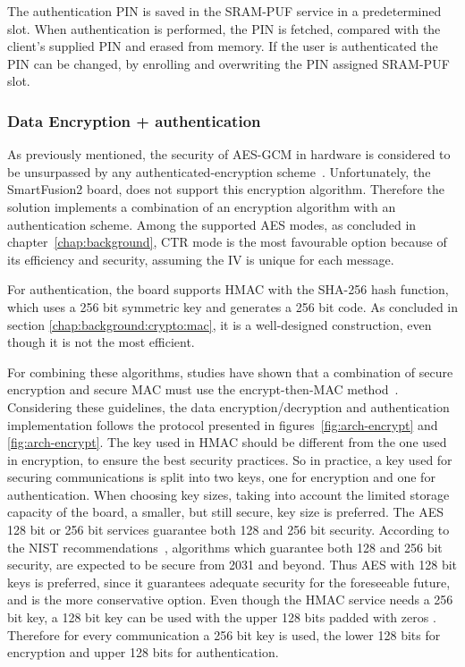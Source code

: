 The authentication PIN is saved in the SRAM-PUF service in a predetermined slot. When authentication is performed, the PIN is fetched, compared with the client's supplied PIN and erased from memory.
If the user is authenticated the PIN can be changed, by enrolling and overwriting the PIN assigned SRAM-PUF slot.

\subsubsection*{Data Encryption + authentication}

As previously mentioned, the security of \ac{AES}-\ac{GCM} in hardware is considered to be unsurpassed by any authenticated-encryption scheme~\cite{aesmodes}.
Unfortunately, the SmartFusion2 board, does not support this encryption algorithm.
Therefore the solution implements a combination of an encryption algorithm with an authentication scheme. Among the supported \ac{AES} modes, as concluded in chapter~\ref{chap:background}, CTR mode is the most favourable option because of its efficiency and security, assuming the IV is unique for each message.

For authentication, the board supports \ac{HMAC} with the \ac{SHA}-256 hash function, which uses a 256 bit symmetric key and generates a 256 bit code. As concluded in section \ref{chap:background:crypto:mac}, it is a well-designed construction, even though it is not the most efficient.

For combining these algorithms, studies have shown that a combination of secure encryption and secure \ac{MAC} must use the encrypt-then-MAC method~\cite{encryptmacorder}.
Considering these guidelines, the data encryption/decryption and authentication implementation follows the protocol presented in figures~\ref{fig:arch-encrypt} and \ref{fig:arch-encrypt}.
The key used in HMAC should be different from the one used in encryption, to ensure the best security practices. So in practice, a key used for securing communications is split into two keys, one for encryption and one for authentication.
When choosing key sizes, taking into account the limited storage capacity of the board, a smaller, but still secure, key size is preferred. The \ac{AES} 128 bit or 256 bit services guarantee both 128 and 256 bit security. According to the \ac{NIST} recommendations~\cite{nistRecommendations}, algorithms which guarantee both 128 and 256 bit security, are expected to be secure from 2031 and beyond. Thus \ac{AES} with 128 bit keys is preferred, since it guarantees adequate security for the foreseeable future, and is the more conservative option.
Even though the HMAC service needs a 256 bit key, a 128 bit key can be used with the upper 128 bits padded with zeros \cite{smartfusionSecurityPractices}.
Therefore for every communication a 256 bit key is used, the lower 128 bits for encryption and upper 128 bits for authentication.

